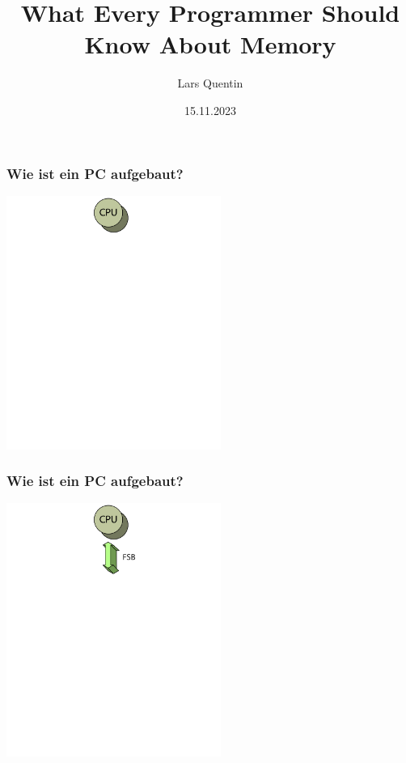\documentclass{beamer}
\title{What Every Programmer Should Know About Memory}
\author{Lars Quentin}
\date{15.11.2023}
\begin{document}
\begin{frame}[t]
\frametitle{Wie ist ein PC aufgebaut?}
\pause
\centering
\includegraphics[width=7cm]{architecture1.png}
\end{frame}

\begin{frame}[t]
\frametitle{Wie ist ein PC aufgebaut?}
\centering
\includegraphics[width=7cm]{architecture2.png}
\end{frame}
\end{document}
